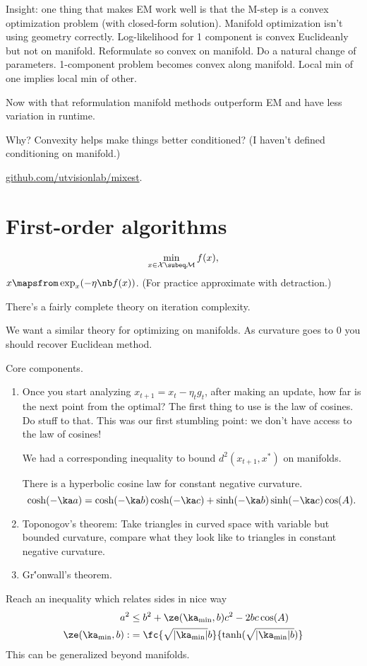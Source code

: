 Insight: one thing that makes EM work well is that the M-step is a convex optimization problem (with closed-form solution). Manifold optimization isn't using geometry correctly. Log-likelihood for 1 component is convex Euclideanly but not on manifold. Reformulate so convex on manifold. 
Do a natural change of parameters. 1-component problem becomes convex along manifold. Local min of one implies local min of other.

Now with that reformulation manifold methods outperform EM and have less variation in runtime. 

Why? Convexity helps make things better conditioned? (I haven't defined conditioning on manifold.)

\url{github.com/utvisionlab/mixest}.

\section{First-order algorithms}

$$
\min_{x\in \cal X\subeq \cal M} f(x),
$$
$x\mapsfrom \exp_x (-\eta\nb f(x))$. (For practice approximate with detraction.)

There's a fairly complete theory on iteration complexity.

We want a similar theory for optimizing on manifolds. As curvature goes to 0 you should recover Euclidean method.

Core components. 
\begin{enumerate}
\item
Once you start analyzing $x_{t+1}=x_t-\eta_tg_t$, after making an update, how far is the next point from the optimal? The first thing to use is the law of cosines. Do stuff to that. This was our first stumbling point: we don't have access to the law of cosines!

We had a corresponding inequality to bound $d^2(x_{t+1},x^*)$ on manifolds.

There is a hyperbolic cosine law for constant negative curvature. 
$$
\cosh(-\ka a)  = \cosh(-\ka b)\cosh(-\ka c) + \sinh(-\ka b) \sinh(-\ka c) \cos(A).
$$
\item
Toponogov's theorem:
Take triangles in curved space with variable but bounded curvature, compare what they look like to triangles in constant negative curvature.
\item
Gr\''onwall's theorem.
\end{enumerate}
Reach an inequality which relates sides in nice way
\begin{align}
a^2&\le b^2 + \ze (\ka_{\min} ,b)c^2 - 2bc \cos(A)\\
\ze(\ka_{\min},b) :&= \fc{\sqrt{|\ka_{\min}|}b}{\tanh(\sqrt{|\ka_{\min}|b})}
\end{align}
This can be generalized beyond manifolds.

